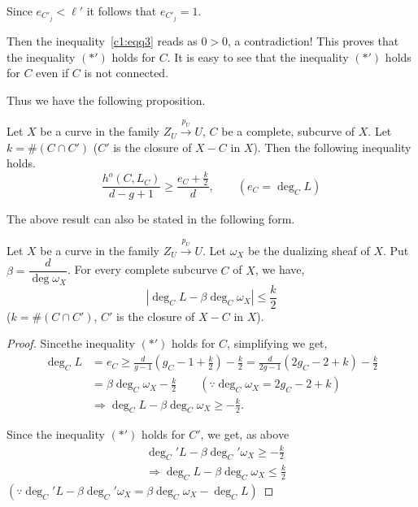 {Since $e_{C'_j} < \ell'$ it follows that $e_{C'_j}=1$.

\noindent
Then the inequality~\eqref{c1:eqq3} reads as $0 > 0$, a contradiction! This
proves that the inequality $(*')$ holds for $C$. It is easy to see
that the inequality $(*')$ holds for $C$ even if $C$ is not
connected. 

\noindent
Thus we have the following proposition.

\begin{subprop}\label{chap1:subprop1.0.10}%
Let $X$ be a curve in the family $Z_U \xrightarrow{p_U} U$, $C$ be a
complete, subcurve of $X$. Let $k = \# (C \cap C')$ ($C'$ is the
closure of $X-C$ in $X$). Then the following inequality holds. 
$$
\frac{h^o (C, L_C)}{d-g+1} \geq \frac{e_C + \frac{k}{2}}{d} , \qquad
(e_C = \deg_C L) 
$$
\end{subprop}

The above result can also be stated in the following form.

\begin{subprop}\label{chap1:subprop1.0.11}%
Let $X$ be a curve in the family $Z_U \xrightarrow{p_U} U$. Let
$\omega_X$ be the dualizing sheaf of $X$. Put $\beta = \dfrac{d}{\deg
  \omega_X}$. For every complete subcurve $C$ of $X$, we have, 
\begin{equation*}
|\deg _C L - \beta \deg _C \omega _X | \leq \frac{k}{2} \tag{$*''$}
\end{equation*}
($k = \# (C \cap C')$, $C'$ is the closure of  $X-C$ in $X$).
\end{subprop}

\begin{proof}
Since\pageoriginale the inequality $(*')$ holds for $C$, simplifying
we get,  
\begin{align*}
\deg_C L & = e_C \geq \frac{d}{g-1} (g_C - 1 + \frac{k}{2}) -
\frac{k}{2} = \frac{d}{2g -1} (2g_C - 2 +k)- \frac{k}{2}\\ 
 & = \beta \deg_C \omega_X - \frac{k}{2} \qquad (\because \deg _C
\omega_X = 2g_C - 2+k) \\
& \Rightarrow \deg_C L - \beta \deg_C \omega_X \geq -
\frac{k}{2}. \tag{1}\label{c1:eqqq1} 
\end{align*}

Since the inequality $(*')$ holds for $C'$, we get, as above 
\begin{align*}
& \deg_C' L - \beta \deg_C' \omega _X \geq - \frac{k}{2}\\
& \Rightarrow \deg_C L - \beta \deg_C \omega_X \leq \frac{k}{2} \tag
  {2}\label{c1:eqqq2} 
\end{align*}
$(\because \deg_C' L - \beta \deg_C' \omega_X = \beta \deg_C \omega_X
- \deg_C L)$ 


\end{proof}}
